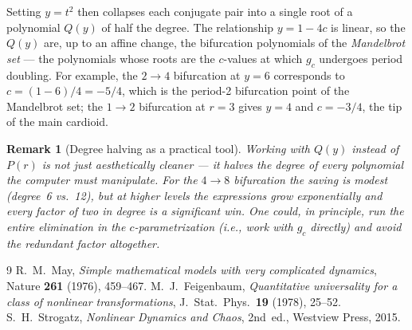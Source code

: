 \documentclass[11pt]{article}
\newtheorem{remark}{Remark}
\begin{document}
Setting $y=t^2$ then collapses each conjugate pair into a single root of a
polynomial $Q(y)$ of half the degree.  The relationship $y = 1-4c$ is linear,
so the $Q(y)$ are, up to an affine change, the bifurcation polynomials of the
\emph{Mandelbrot set} --- the polynomials whose roots are the $c$-values at
which $g_c$ undergoes period doubling.  For example, the $2\to4$ bifurcation
at $y=6$ corresponds to $c=(1-6)/4=-5/4$, which is the period-2 bifurcation
point of the Mandelbrot set; the $1\to2$ bifurcation at $r=3$ gives $y=4$ and
$c=-3/4$, the tip of the main cardioid.

\begin{remark}[Degree halving as a practical tool]
Working with $Q(y)$ instead of $P(r)$ is not just aesthetically cleaner --- it
halves the degree of every polynomial the computer must manipulate.  For the
$4\to 8$ bifurcation the saving is modest (degree~6 vs.~12), but at higher
levels the expressions grow exponentially and every factor of two in degree is a
significant win.  One could, in principle, run the entire elimination in the
$c$-parametrization (i.e., work with $g_c$ directly) and avoid the redundant
factor altogether.
\end{remark}

\begin{thebibliography}{9}
R.~M.~May, \emph{Simple mathematical models with very complicated dynamics},
Nature \textbf{261} (1976), 459--467.
M.~J.~Feigenbaum, \emph{Quantitative universality for a class of nonlinear
transformations}, J.~Stat.\ Phys.\ \textbf{19} (1978), 25--52.
S.~H.~Strogatz, \emph{Nonlinear Dynamics and Chaos}, 2nd~ed., Westview Press, 2015.
\end{thebibliography}
\end{document}
